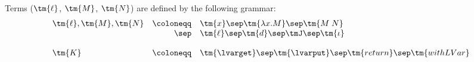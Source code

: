 Terms ($\tm{\ell}$, $\tm{M}$, $\tm{N}$) are defined by the following grammar:
\[
  \begin{array}{lrll}
  \tm{\ell}, \tm{M}, \tm{N}
  & \coloneqq & \tm{x}
     \sep        \tm{\lambda x.M}
     \sep        \tm{M\;N}   \\
  & \sep      & \tm{\ell}
      \sep        \tm{d}
       \sep        \tmJ
       \sep       \tm{\iota}
  \\
  \\
   \tm{K}
  & \coloneqq & \tm{\lvarget}
    \sep        \tm{\lvarput}
    \sep        \tm{return}
    \sep        \tm{withLVar}
\end{array}
\]